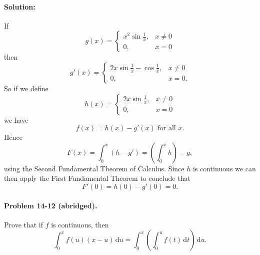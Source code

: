 \documentclass{article}
\begin{document}
\paragraph{Solution:} If \begin{equation*}
  g(x) = \begin{cases}
    x^2\sin\frac{1}{x}, &x \neq 0 \\
    0, &x = 0
  \end{cases}
\end{equation*} then \begin{equation*}
  g'(x) = \begin{cases}
    2x\sin\frac{1}{x} - \cos\frac{1}{x}, &x \neq 0 \\
    0, &x = 0.
  \end{cases}
\end{equation*} So if we define \begin{equation*}
  h(x) = \begin{cases}
    2x\sin\frac{1}{x}, &x \neq 0 \\
    0, &x = 0
  \end{cases}
\end{equation*} we have \begin{equation*}
  f(x) = h(x) - g'(x) \text{ for all } x.
\end{equation*} Hence \begin{equation*}
  F(x) = \int_0^x (h - g') = \left(\int_0^x h\right) - g,
\end{equation*} using the Second Fundamental Theorem of Calculus. Since $h$ is
continuous we can then apply the First Fundamental Theorem to conclude that
\begin{equation*}
  F'(0) = h(0) - g'(0) = 0.
\end{equation*}

\paragraph{Problem 14-12 (abridged).} Prove that if $f$ is continuous, then
\begin{equation*}
  \int_0^x f(u)(x - u) \,\mathrm{d}u
  = \int_0^x \left(\int_0^u f(t) \,\mathrm{d}t\right) \,\mathrm{d}u.
\end{equation*}
\end{document}
